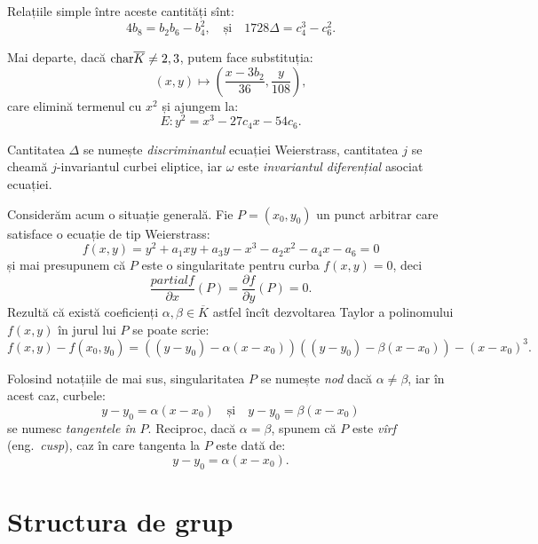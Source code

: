 Relațiile simple între aceste cantități sînt:
\[
    4b_8 = b_2b_6 - b_4^2, \quad \text{și} \quad 1728\Delta = c_4^3 - c_6^2.
\]

Mai departe, dacă $ \mathrm{char}\overline{K} \neq 2, 3 $, putem face substituția:
\[
    (x, y) \mapsto \left( \dfrac{x - 3b_2}{36}, \dfrac{y}{108} \right),
\]
care elimină termenul cu $ x^2 $ și ajungem la:
\[
      E : y^2 = x^3 - 27c_4x - 54c_6.
\]

\begin{definition}\label{def:invarianti-weierstrass}
    Cantitatea $ \Delta $ se numește \emph{discriminantul} ecuației Weierstrass,
    cantitatea $ j $ se cheamă $ j $-invariantul curbei eliptice, iar
    $ \omega $ este \emph{invariantul diferențial} asociat ecuației.
\end{definition}

Considerăm acum o situație generală. Fie $ P = (x_0, y_0) $ un punct arbitrar care
satisface o ecuație de tip Weierstrass:
\[
    f(x, y) = y^2 + a_1 xy + a_3 y - x^3 - a_2x^2 - a_4 x - a_6 = 0
\]
și mai presupunem că $ P $ este o singularitate pentru curba $ f(x, y) = 0 $, deci
\[
    \dfrac{partial f}{\partial x}(P) = \dfrac{\partial f}{\partial y}(P) = 0.
\]
Rezultă că există coeficienți $ \alpha, \beta \in \overline{K} $ astfel încît
dezvoltarea Taylor a polinomului $ f(x, y) $ în jurul lui $ P $ se poate scrie:
\[
    f(x, y) - f(x_0, y_0) = ((y - y_0) - \alpha(x - x_0))((y - y_0) - \beta(x - x_0)) - %
    (x - x_0)^3.
\]

\begin{definition}\label{def:nod}
    Folosind notațiile de mai sus, singularitatea $ P $ se numește \emph{nod} dacă
    $ \alpha \neq \beta $, iar în acest caz, curbele:
    \[
        y - y_0 = \alpha(x - x_0) \quad \text{și} \quad y - y_0 = \beta(x - x_0)
    \]
    se numesc \emph{tangentele în $ P $}. Reciproc, dacă $ \alpha = \beta $,
    spunem că $ P $ este \emph{vîrf} (eng.\ \textit{cusp}), caz în care
    tangenta la $ P $ este dată de:
    \[
        y - y_0 = \alpha(x - x_0).
    \]
\end{definition}

\section{Structura de grup}

